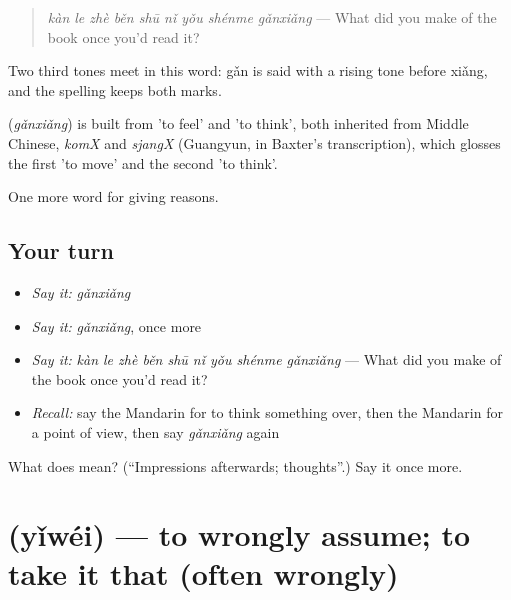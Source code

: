 \begin{quote}
\textbf{} \emph{kàn le zhè běn shū nǐ yǒu shénme gǎnxiǎng} — What did you make of the book once you'd read it?
\end{quote}

Two third tones meet in this word: gǎn is said with a rising tone before xiǎng, and the spelling keeps both marks.

\begin{cousinweb}
\textbf{} (\emph{gǎnxiǎng}) is built from  'to feel' and  'to think', both inherited from Middle Chinese, \emph{komX} and \emph{sjangX} (Guangyun, in Baxter's transcription), which glosses the first 'to move' and the second 'to think'.
\end{cousinweb}

\begin{grammarlens}[title={What you've built}]
One more word for giving reasons.
\end{grammarlens}

\subsection*{Your turn}
\begin{itemize}
\raggedright
  \item \emph{Say it:} \emph{gǎnxiǎng}
  \item \emph{Say it:} \emph{gǎnxiǎng}, once more
  \item \emph{Say it:} \emph{kàn le zhè běn shū nǐ yǒu shénme gǎnxiǎng} — What did you make of the book once you'd read it?
  \item \emph{Recall:} say the Mandarin for to think something over, then the Mandarin for a point of view, then say \emph{gǎnxiǎng} again
\end{itemize}

\begin{tcolorbox}[breakable,colback=teal!4,colframe=teal!35!black,title={Before you move on}]
What does  mean? (\textquotedblleft{}Impressions afterwards; thoughts\textquotedblright{}.) Say it once more.
\end{tcolorbox}
\section[\texorpdfstring{\zh{以为} (yǐwéi)}{以为 (yǐwéi)}]{ (yǐwéi) — to wrongly assume; to take it that (often wrongly)}

\label{lesson:ZH-C346-yiwei}



